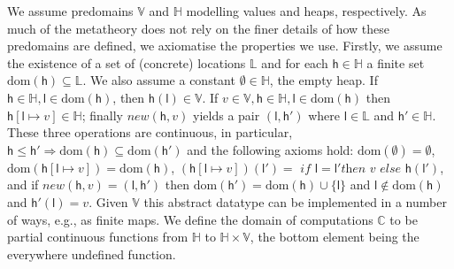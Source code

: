 \documentclass[orivec]{llncs}
\newif\iffull\fullfalse
\renewcommand{\paragraph}[1]{\noindent {\bf #1}}
\newcommand{\partfun}{\rightharpoondown}
\newcommand{\labs}{\mathbb{L}}
\newcommand{\dom}[1]{\mathrm{dom}({#1})}
\newcommand{\squelch}[1]{}
\newcommand{\Locs}{\ensuremath{\labs}}
\newcommand{\new}{\ensuremath{\mathit{new}}}
\newcommand{\Stores}{\ensuremath{\mathbb{H}}}
\newcommand{\cloc}{\ensuremath{\mathsf{l}}\xspace}
\newcommand\heap{\ensuremath{\mathsf{h}}\xspace}
\newcommand{\Values}{\mathbb{V}}
\newcommand{\Comps}{\mathbb{C}}
\begin{document}
\paragraph{Denotational model} 
\iffull
A \emph{predomain} is an $\omega$-cpo, i.e. a partial order with suprema
of ascending chains. A \emph{domain} is a predomain with a least element,
$\bot$. \squelch{We use predomains and continuous functions, rather than sets
and functions, so as to be able to interpret recursive definitions.}
Recall that $f:A\rightarrow A'$ is \emph{continuous} if it is monotone
$x\leq
y \Rightarrow f(x)\leq f(y)$ and preserves suprema of ascending
chains, i.e., $f(\sup_i x_i)=sup_i f(x_i)$. Any set is a predomain with the
discrete
order. If $X$ is a set and $A$ a predomain then
any $f:X\rightarrow A$ is continuous. A subset $U$ of a
predomain $A$ is \emph{admissible} if whenever $(a_i)_i$ is an ascending
chain in $A$ such that $a_i\in U$ for all $i$, then $\sup_i a_i\in U$,
too. If $f:X\times A\rightarrow A$ is continuous and $A$ is a domain
then one defines $f^\dagger(x)=\sup_if_x^i(\bot)$ with
$f_x(a)=f(x,a)$. One has, $f(x,f^\dagger(x))=f^\dagger(x)$ and if
$U\subseteq A$ is admissible and $f:X\times U\rightarrow U$ then
$f^\dagger:X\rightarrow U$, too. We denote a partial (continuous)
function from set (predomain) $A$ to set (predomain) $B$ by $f:A
\partfun B$.  
\fi
We assume predomains $\Values$ and $\Stores$ modelling values and heaps,
respectively. As much of the metatheory does not rely on the finer
details of how these predomains are defined, we axiomatise the
properties we use.  Firstly, we assume the existence of a set of
(concrete) locations $\labs$ and for each $\heap\in\Stores$ a finite
set $\dom\heap\subseteq\labs$. We also assume a constant
$\emptyset\in\Stores$, the empty heap.  If $
\heap \in \Stores, \cloc \in \dom{\heap}$, then $\heap(\cloc)
\in \Values$. If $v\in
\Values, \heap \in \Stores, \cloc\in\dom{\heap}$ then $\heap[\cloc{\mapsto}
v]\in\Stores$; finally $\new(\heap,v)$ yields a pair $(\cloc,\heap')$
where $\cloc\in\Locs$ and $\heap'\in\Stores$. These three operations
are continuous, in particular, $\heap\leq\heap'\Rightarrow
\dom\heap\subseteq \dom{\heap'}$ and the following axioms hold:
$\dom{\emptyset}=\emptyset$,
$\dom{\heap[\cloc{\mapsto}v]}=\dom{\heap}$,
$(\heap[\cloc{\mapsto}v])(\cloc') =$ $\textit{if }\cloc=\cloc'\textit{
  then }v\textit{ else } \heap(\cloc')$, and if
$\new(\heap,v)=(\cloc,\heap')$ then
$\dom{\heap'}=\dom{\heap}\cup\{\cloc\}$ and $\cloc\not\in\dom{\heap}$
and $\heap'(\cloc)=v$.  Given $\Values$ this abstract datatype can be
implemented in a number of ways, e.g., as finite maps.
We define the domain of computations $\Comps$ to be 
partial continuous functions from $\Stores$ to $\Stores\times
\Values$, the bottom element being the everywhere undefined function.
\end{document}
